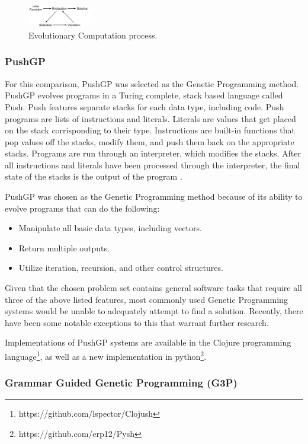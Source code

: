 \begin{figure}[t]
\centering
\includegraphics[width=0.25\textwidth]{res/EvolutionCycle}
\caption{Evolutionary Computation process.}
\label{fig:evo}
\end{figure}

\subsubsection{PushGP}

For this comparison, PushGP was selected as the Genetic Programming method. PushGP evolves programs in a Turing complete, stack based language called Push. Push features separate stacks for each data type, including code. Push programs are lists of instructions and literals. Literals are values that get placed on the stack corrisponding to their type. Instructions are built-in functions that pop values off the stacks, modify them, and push them back on the appropriate stacks. Programs are run through an interpreter, which modifies the stacks. After all instructions and literals have been processed through the interpreter, the final state of the stacks is the output of the program \cite{Spector2002}.

PushGP was chosen as the Genetic Programming method because of its ability to evolve programs that can do the following:
\begin{itemize}
\item Manipulate all basic data types, including vectors.
\item Return multiple outputs.
\item Utilize iteration, recursion, and other control structures.
\end{itemize}

Given that the chosen problem set contains general software tasks that require all three of the above listed features, most commonly used Genetic Programming systems would be unable to adequately attempt to find a solution. Recently, there have been some notable exceptions to this that warrant further research.

Implementations of PushGP systems are available in the Clojure programming language\footnote{https://github.com/lspector/Clojush}, as well as a new implementation in python\footnote{https://github.com/erp12/Pysh}.

\subsubsection{Grammar Guided Genetic Programming (G3P)}

